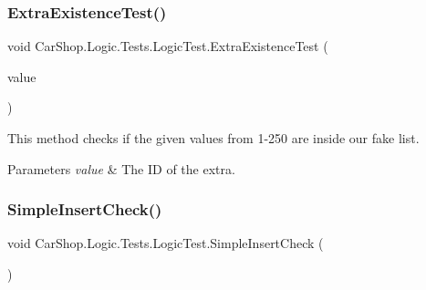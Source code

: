 \subsubsection{\texorpdfstring{Extra\+Existence\+Test()}{ExtraExistenceTest()}}
{\footnotesize\ttfamily void Car\+Shop.\+Logic.\+Tests.\+Logic\+Test.\+Extra\+Existence\+Test (\begin{DoxyParamCaption}\item[{\mbox{[}\+Values(1, 2, 3, 4, 5, 6, 7, 8, 9, 10, 11, 12, 13, 14, 15, 16, 17, 18, 19, 20, 21, 22, 23, 24, 25, 26, 27, 28, 29, 30, 31, 32, 33, 34, 35, 36, 37, 38, 39, 40, 41, 42, 43, 44, 45, 46, 47, 48, 49, 50, 51, 52, 53, 54, 55, 56, 57, 58, 59, 60, 61, 62, 63, 64, 65, 66, 67, 68, 69, 70, 71, 72, 73, 74, 75, 76, 77, 78, 79, 80, 81, 82, 83, 84, 85, 86, 87, 88, 89, 90, 91, 92, 93, 94, 95, 96, 97, 98, 99, 100, 101, 102, 103, 104, 105, 106, 107, 108, 109, 110, 111, 112, 113, 114, 115, 116, 117, 118, 119, 120, 121, 122, 123, 124, 125, 126, 127, 128, 129, 130, 131, 132, 133, 134, 135, 136, 137, 138, 139, 140, 141, 142, 143, 144, 145, 146, 147, 148, 149, 150, 151, 152, 153, 154, 155, 156, 157, 158, 159, 160, 161, 162, 163, 164, 165, 166, 167, 168, 169, 170, 171, 172, 173, 174, 175, 176, 177, 178, 179, 180, 181, 182, 183, 184, 185, 186, 187, 188, 189, 190, 191, 192, 193, 194, 195, 196, 197, 198, 199, 200, 201, 202, 203, 204, 205, 206, 207, 208, 209, 210, 211, 212, 213, 214, 215, 216, 217, 218, 219, 220)\mbox{]} int}]{value }\end{DoxyParamCaption})}



This method checks if the given values from 1-\/250 are inside our fake list. 


\begin{DoxyParams}{Parameters}
{\em value} & The ID of the extra.\\
\hline
\end{DoxyParams}
\mbox{\label{class_car_shop_1_1_logic_1_1_tests_1_1_logic_test_ab4e6c26ad9e6ba7b68eefa5aba8cff92}} 
\subsubsection{\texorpdfstring{Simple\+Insert\+Check()}{SimpleInsertCheck()}}
{\footnotesize\ttfamily void Car\+Shop.\+Logic.\+Tests.\+Logic\+Test.\+Simple\+Insert\+Check (\begin{DoxyParamCaption}{ }\end{DoxyParamCaption})}



